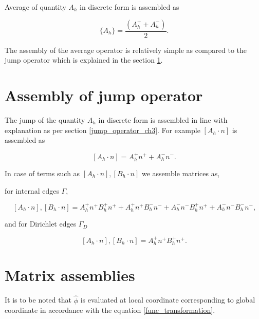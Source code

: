 \documentclass[a4paper,twoside,openright]{book}
\begin{document}
Average of quantity $A_h$ in discrete form is assembled as

\begin{equation}\label{Average operator}
\lbrace A_h \rbrace = \frac{(A_h^+ + A_h^-)}{2} \textrm{.}
\end{equation}

The assembly of the average operator is relatively simple as compared to the jump operator which is explained in the section \ref{Jump operator}.

\section{Assembly of jump operator} \label{Jump operator}

The jump of the quantity $A_h$ in discrete form is assembled in line with explanation as per section \ref{jump_operator_ch3}. For example $[A_h \cdot n]$ is assembled as

\begin{equation} \label{Jump_operator}
[A_h \cdot n] = A_h^+ n^+ + A_h^- n^- \textrm{.}
\end{equation}

In case of terms such as $[A_h \cdot n],[B_h \cdot n]$ we assemble matrices as, 

for internal edges $\Gamma$,

\begin{equation} \label{Jump operator L2}
[A_h \cdot n],[B_h \cdot n] = A_h^+ n^+ B_h^+ n^+ + A_h^+ n^+ B_h^- n^- + A_h^- n^- B_h^+ n^+ + A_h^- n^- B_h^- n^- \textrm{,}
\end{equation}

and for Dirichlet edges $\Gamma_D$

\begin{equation} \label{Jump operator L2 for dirichlet}
[A_h \cdot n],[B_h \cdot n] = A_h^+ n^+ B_h^+ n^+ \textrm{.}
\end{equation}


\section{Matrix assemblies} \label{matrix_assembly_ch4}

It is to be noted that $\hat{\phi}$ is evaluated at local coordinate corresponding to global coordinate in accordance with the equation \eqref{func_transformation}.
\end{document}
